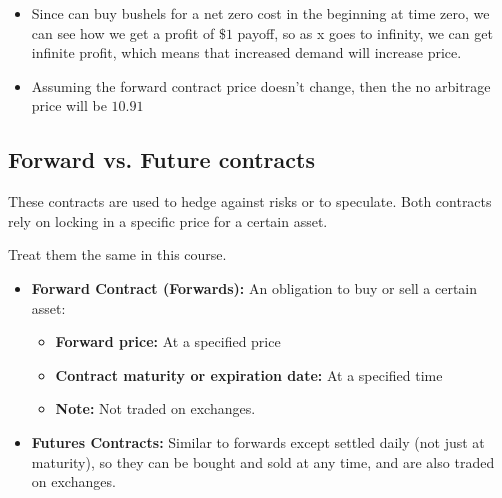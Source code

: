 \begin{example}
    \begin{itemize}
        \item Since can buy bushels for a net zero cost in the beginning at time zero, we can see how we get a profit of $\$1$ payoff, so as x goes to infinity, we can get infinite profit, which means that increased demand will increase price.
        \item Assuming the forward contract price doesn't change, then the no arbitrage price will be $10.91$
    \end{itemize}
\end{example}

\subsection{Forward vs. Future contracts}
These contracts are used to hedge against risks or to speculate. Both contracts rely on locking in a specific price for a certain asset.
\begin{warning}
    Treat them the same in this course.
\end{warning}

\begin{terminology}
    \begin{itemize}
        \item \textbf{Forward Contract (Forwards):} An obligation to buy or sell a certain asset:
        \begin{itemize}
            \item \textbf{Forward price:} At a specified price 
            \item \textbf{Contract maturity or expiration date:} At a specified time
            \item \textbf{Note:} Not traded on exchanges.
        \end{itemize}
        
        \item \textbf{Futures Contracts:} Similar to forwards except settled daily (not just at maturity), so they can be bought and sold at any time, and are also traded on exchanges.
    \end{itemize}
\end{terminology}

\begin{intuition}
\end{intuition}

